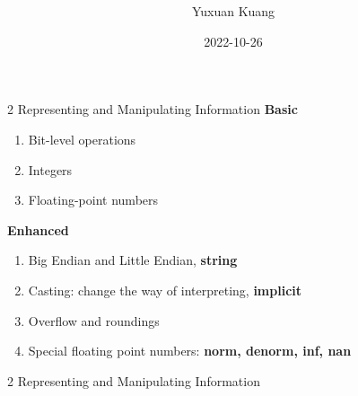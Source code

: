 \documentclass{beamer}
\title{\textbf{\topic}}
\author{Yuxuan Kuang}
\institute{School of EECS, PKU}
\date{2022-10-26}
\begin{document}
{ 
\frame{\titlepage}}

\begin{frame}{2 Representing and Manipulating Information}
\textbf{Basic}
\begin{enumerate}
	\item Bit-level operations
	\item Integers
	\item Floating-point numbers
\end{enumerate}
\textbf{Enhanced}
\begin{enumerate}
	\item Big Endian and Little Endian, \textbf{string} %
	\item Casting: change the way of interpreting, \textbf{implicit}
	\item Overflow and roundings
	\item Special floating point numbers: \textbf{norm, denorm, inf, nan}
\end{enumerate}
\end{frame}

\begin{frame}{2 Representing and Manipulating Information}
 {
}
 {
}
\end{frame}
\end{document}
